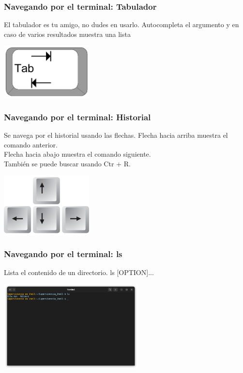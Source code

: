 \documentclass[10pt]{beamer}
\begin{document}
	\begin{frame}
		\frametitle{Navegando por el terminal: Tabulador}
		\begin{alertblock}{El tabulador es tu amigo, no dudes en usarlo.}
			Autocompleta el argumento y en caso de varios resultados muestra una lista
		\end{alertblock}
		\begin{center}
			\includegraphics[width=0.35\textwidth]{tab}
		\end{center}
	\end{frame}
	
	\begin{frame}
		\frametitle{Navegando por el terminal: Historial}
		\begin{alertblock}{Se navega por el historial usando las flechas.}
			Flecha hacia arriba muestra el comando anterior.\\
			Flecha hacia abajo muestra el comando siguiente.\\
			También se puede buscar usando Ctr + R.
		\end{alertblock}
		\begin{center}
			\includegraphics[width=0.35\textwidth]{keys}
		\end{center}
	\end{frame}
	
	\begin{frame}
		\frametitle{Navegando por el terminal: ls}
		\begin{alertblock}{Lista el contenido de un directorio.}
			ls [OPTION]...
		\end{alertblock}
		\begin{center}
			\includegraphics[width=0.55\textwidth]{ls}
		\end{center}
	\end{frame}
	
\end{document}

